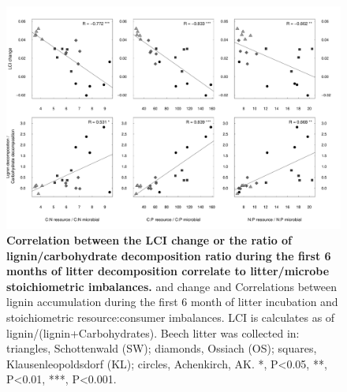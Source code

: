 \documentclass[10pt]{article}
\begin{document}
\begin{flushleft}
\newpage
\begin{figure}[h!]
\vspace*{2mm}
\begin{center}
\includegraphics{ligpaper-graphcorr}
\end{center}
\caption{
{\bf Correlation between the LCI change or the ratio of lignin/carbohydrate decomposition ratio during the first 6 months of litter decomposition correlate to litter/microbe stoichiometric imbalances.} and change and Correlations between lignin accumulation during the first 6 month of litter incubation and stoichiometric resource:consumer imbalances. LCI is calculates as of lignin/(lignin+Carbohydrates).  Beech litter was collected in: triangles, Schottenwald (SW); diamonds, Ossiach (OS); squares, Klausenleopoldsdorf (KL); circles, Achenkirch, AK. *, P\textless 0.05, **, P\textless 0.01, ***, P\textless 0.001.}
\label{fig:cor1}
\end{figure}




\end{flushleft}
\end{document}
